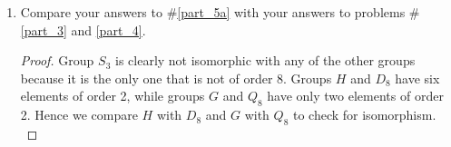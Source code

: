 \documentclass{article}
\begin{document}
\begin{enumerate}
\begin{enumerate}
\begin{proof}
          Finally, $Q_8$ is generated by elements $-1,i,j,k$, and is
          defined by the following generating rules: 
          \begin{equation} \label{eqn:Q8}
            \begin{cases}
              (-1)\; \text{commutes with all generators} \\
              (-1)^2 = 1 \\
              i^2 = j^2 = k^2 = -1 \\
              ijk = -1
            \end{cases}
          \end{equation}
          \begin{center}
            \begin{tabular}{|c||c|c|c|c|c|c|c|c|}
              \hline
              $Q_8$     & $1$   & $-1$  & $i$     & $-i$  & $j$   & $-j$  & $k$     & $-k$ \\
              \hline\hline
              $1$       & $1$   & $-1$  & $i$     & $-i$  & $j$   & $-j$  & $k$     & $-k$ \\
              \hline
              $-1$      & $-1$  & $1$   & $-i$    & $i$   & $-j$  & $j$   & $-k$    & $k$ \\
              \hline
              $i$       & $i$   & $-i$  & $-1$    & $1$   & $k$   & $-k$  & $-j$    & $j$ \\
              \hline
              $-i$      & $-i$  & $i$   & $1$     & $-1$  & $-k$  & $k$   & $j$     & $-j$ \\
              \hline
              $j$       & $j$   & $-j$  & $-k$    & $k$   & $-1$  & $1$   & $i$     & $-i$ \\
              \hline
              $-j$      & $-j$  & $j$   & $k$     & $-k$  & $1$   & $-1$  & $-i$    & $i$ \\
              \hline
              $k$       & $k$   & $-k$  & $j$     & $-j$  & $-i$  & $i$   & $-1$    & $1$ \\
              \hline
              $-k$      & $-k$  & $k$   & $-j$    & $j$   & $i$   & $-i$  & $1$     & $-1$ \\
              \hline
            \end{tabular}
          \end{center}
        \end{proof}
      \item Compare your answers to \#\ref{part_5a} with your answers to
        problems \#\ref{part_3} and \ref{part_4}.
        \begin{proof}
          Group $S_3$ is clearly not isomorphic with any of the other
          groups because it is the only one that is not of order 8. Groups
          $H$ and $D_8$ have six elements of order 2, while groups $G$ and
          $Q_8$ have only two elements of order 2. Hence we compare $H$
          with $D_8$ and $G$ with $Q_8$ to check for isomorphism. \\


\end{proof}
\end{enumerate}
\end{enumerate}
\end{document}
